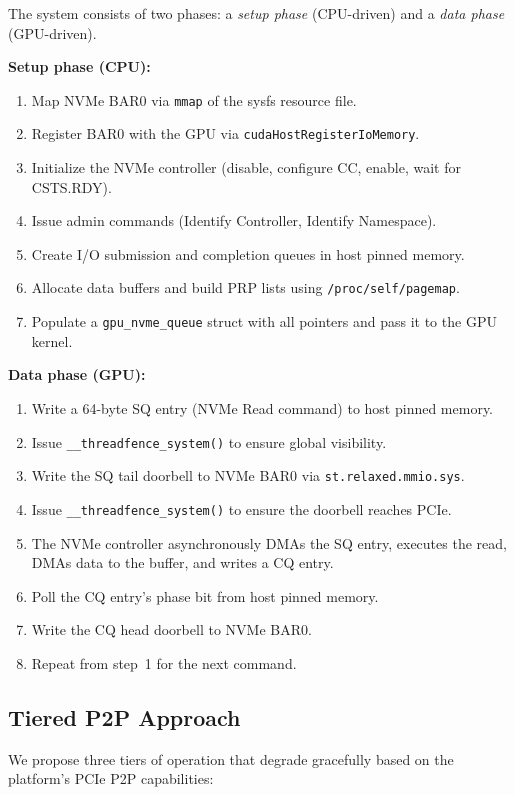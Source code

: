 \documentclass{article}
\begin{document}
The system consists of two phases: a \emph{setup phase} (CPU-driven) and a
\emph{data phase} (GPU-driven).

\textbf{Setup phase (CPU):}
\begin{enumerate}[leftmargin=*,topsep=2pt,itemsep=1pt]
\item Map NVMe BAR0 via \texttt{mmap} of the sysfs resource file.
\item Register BAR0 with the GPU via \texttt{cudaHostRegisterIoMemory}.
\item Initialize the NVMe controller (disable, configure CC, enable, wait
  for CSTS.RDY).
\item Issue admin commands (Identify Controller, Identify Namespace).
\item Create I/O submission and completion queues in host pinned memory.
\item Allocate data buffers and build PRP lists using
  \texttt{/proc/self/pagemap}.
\item Populate a \texttt{gpu\_nvme\_queue} struct with all pointers and pass
  it to the GPU kernel.
\end{enumerate}

\textbf{Data phase (GPU):}
\begin{enumerate}[leftmargin=*,topsep=2pt,itemsep=1pt]
\item Write a 64-byte SQ entry (NVMe Read command) to host pinned memory.
\item Issue \texttt{\_\_threadfence\_system()} to ensure global visibility.
\item Write the SQ tail doorbell to NVMe BAR0 via \texttt{st.relaxed.mmio.sys}.
\item Issue \texttt{\_\_threadfence\_system()} to ensure the doorbell reaches PCIe.
\item The NVMe controller asynchronously DMAs the SQ entry, executes the read,
  DMAs data to the buffer, and writes a CQ entry.
\item Poll the CQ entry's phase bit from host pinned memory.
\item Write the CQ head doorbell to NVMe BAR0.
\item Repeat from step~1 for the next command.
\end{enumerate}

\subsection{Tiered P2P Approach}

We propose three tiers of operation that degrade gracefully based on the
platform's PCIe P2P capabilities:
\end{document}
